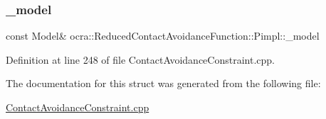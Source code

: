 \hypertarget{structReducedContactAvoidanceFunction_1_1Pimpl_acd2bf5f47839d39cb37ac323e038558f}{}\label{structReducedContactAvoidanceFunction_1_1Pimpl_acd2bf5f47839d39cb37ac323e038558f} 
\subsubsection{\texorpdfstring{\+\_\+model}{\_model}}
{\footnotesize\ttfamily const Model\& ocra\+::\+Reduced\+Contact\+Avoidance\+Function\+::\+Pimpl\+::\+\_\+model}



Definition at line 248 of file Contact\+Avoidance\+Constraint.\+cpp.



The documentation for this struct was generated from the following file\+:\begin{DoxyCompactItemize}
\item 
\hyperlink{ContactAvoidanceConstraint_8cpp}{Contact\+Avoidance\+Constraint.\+cpp}\end{DoxyCompactItemize}
